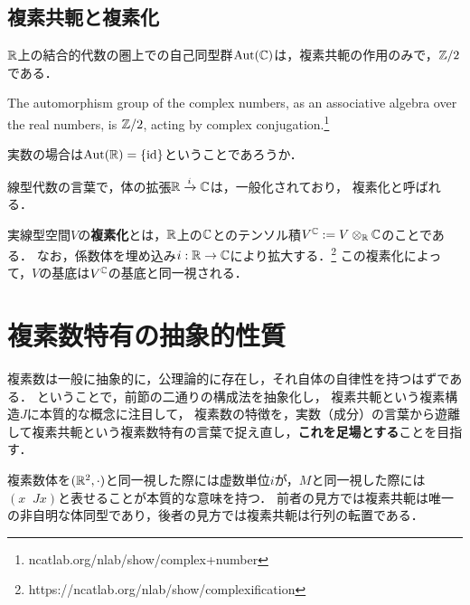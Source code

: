 \documentclass[uplatex, dvipdfmx]{jsreport}
\begin{document}
\subsection{複素共軛と複素化}

\begin{proposition}
    $\mathbb{R}$上の結合的代数の圏上での自己同型群$\mathrm{Aut}(\mathbb{C})$は，複素共軛の作用のみで，$\mathbb{Z}/2$である．

    The automorphism group of the complex numbers, as an associative algebra over the real numbers, is $\mathbb{Z}/2$, acting by complex conjugation.\footnote{ncatlab.org/nlab/show/complex+number}
\end{proposition}
\begin{remark}
    実数の場合は$\mathrm{Aut}(\mathbb{R})=\{\mathrm{id}\}$ということであろうか．
\end{remark}

線型代数の言葉で，体の拡張$\mathbb{R}\xrightarrow{i}\mathbb{C}$は，一般化されており，
複素化と呼ばれる．

\begin{definition}[complexification]
    実線型空間$V$の\textbf{複素化}とは，$\mathbb{R}$上の$\mathbb{C}$とのテンソル積$V^{\mathbb{C}}:=V\otimes_{\mathbb{R}}\mathbb{C}$のことである．
    なお，係数体を埋め込み$i:\mathbb{R}\to\mathbb{C}$により拡大する．\footnote{https://ncatlab.org/nlab/show/complexification}
    この複素化によって，$V$の基底は$V^{\mathbb{C}}$の基底と同一視される．
\end{definition}

\section{複素数特有の抽象的性質}

\begin{screen}
    複素数は一般に抽象的に，公理論的に存在し，それ自体の自律性を持つはずである．
    ということで，前節の二通りの構成法を抽象化し，
    複素共軛という複素構造$J$に本質的な概念に注目して，
    複素数の特徴を，実数（成分）の言葉から遊離して複素共軛という複素数特有の言葉で捉え直し，\textbf{これを足場とする}ことを目指す．

    複素数体を$(\mathbb{R}^2,\cdot)$と同一視した際には虚数単位$i$が，$M$と同一視した際には$(x\;\;Jx)$と表せることが本質的な意味を持つ．
    前者の見方では複素共軛は唯一の非自明な体同型であり，後者の見方では複素共軛は行列の転置である．
\end{screen}
\end{document}

